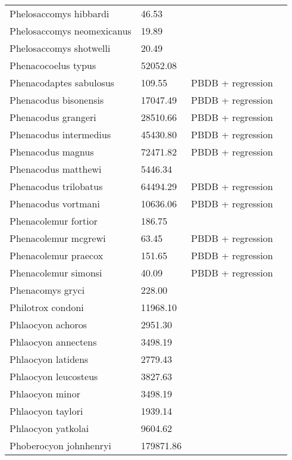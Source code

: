 \documentclass{article}
\begin{document}
\begin{center}
\begin{longtable}{p{} p{} p{} p{}}
    Phelosaccomys hibbardi & 46.53 & \cite{Tomiya2013} &  \\ 
    Phelosaccomys neomexicanus & 19.89 & \cite{Tomiya2013} &  \\ 
    Phelosaccomys shotwelli & 20.49 & \cite{Tomiya2013} &  \\ 
    Phenacocoelus typus & 52052.08 & \cite{Tomiya2013} &  \\ 
    Phenacodaptes sabulosus & 109.55 & PBDB + regression &  \\ 
    Phenacodus bisonensis & 17047.49 & PBDB + regression &  \\ 
    Phenacodus grangeri & 28510.66 & PBDB + regression &  \\ 
    Phenacodus intermedius & 45430.80 & PBDB + regression &  \\ 
    Phenacodus magnus & 72471.82 & PBDB + regression &  \\ 
    Phenacodus matthewi & 5446.34 & \cite{Cope1871} &  \\ 
    Phenacodus trilobatus & 64494.29 & PBDB + regression &  \\ 
    Phenacodus vortmani & 10636.06 & PBDB + regression &  \\ 
    Phenacolemur fortior & 186.75 & \cite{Wood1962} &  \\ 
    Phenacolemur mcgrewi & 63.45 & PBDB + regression &  \\ 
    Phenacolemur praecox & 151.65 & PBDB + regression &  \\ 
    Phenacolemur simonsi & 40.09 & PBDB + regression &  \\ 
    Phenacomys gryci & 228.00 & \cite{McKenna2011} &  \\ 
    Philotrox condoni & 11968.10 & \cite{Tomiya2013} &  \\ 
    Phlaocyon achoros & 2951.30 & \cite{Tomiya2013} &  \\ 
    Phlaocyon annectens & 3498.19 & \cite{Tomiya2013} &  \\ 
    Phlaocyon latidens & 2779.43 & \cite{Tomiya2013} &  \\ 
    Phlaocyon leucosteus & 3827.63 & \cite{Tomiya2013} &  \\ 
    Phlaocyon minor & 3498.19 & \cite{Tomiya2013} &  \\ 
    Phlaocyon taylori & 1939.14 & \cite{Tomiya2013} &  \\ 
    Phlaocyon yatkolai & 9604.62 & \cite{Tomiya2013} &  \\ 
    Phoberocyon johnhenryi & 179871.86 & \cite{Tomiya2013} &  \\ 

\end{longtable}
\end{center}
\end{document}
